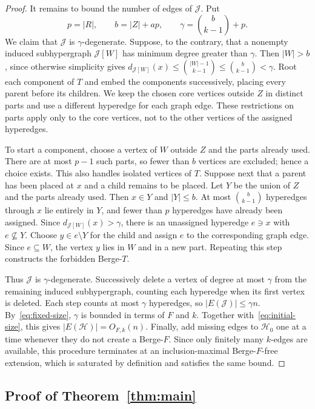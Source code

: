 \documentclass[11pt,a4paper]{article}
\numberwithin{equation}{section}
\theoremstyle{definition}
\theoremstyle{plain}
\newcommand{\HH}{\mathcal H}
\newcommand{\JJ}{\mathcal J}
\begin{document}
\begin{proof}
It remains to bound the number of edges of $\JJ$. Put
\[
 p=|R|,\qquad b=|Z|+ap,\qquad
 \gamma=\binom b{k-1}+p.
\]
We claim that $\JJ$ is $\gamma$-degenerate. Suppose, to the contrary,
that a nonempty induced subhypergraph $\JJ[W]$ has minimum degree
greater than $\gamma$. Then $|W|>b$, since otherwise simplicity gives
$d_{\JJ[W]}(x)\le\binom{|W|-1}{k-1}\le\binom b{k-1}<\gamma$.
Root each component of $T$ and embed the components successively,
placing every parent before its children. We keep the chosen core
vertices outside $Z$ in distinct parts and use a different hyperedge
for each graph edge. These restrictions on parts apply only to the
core vertices, not to the other vertices of the assigned hyperedges.

To start a component, choose a vertex of $W$ outside $Z$ and the
parts already used. There are at most $p-1$ such parts, so fewer
than $b$ vertices are excluded; hence a choice exists. This also
handles isolated vertices of $T$.
Suppose next that a parent has been placed at $x$ and a child remains
to be placed. Let $Y$ be the union of $Z$ and the parts already used.
Then $x\in Y$ and $|Y|\le b$. At most $\binom b{k-1}$ hyperedges
through $x$ lie entirely in $Y$, and fewer than $p$ hyperedges have
already been assigned. Since $d_{\JJ[W]}(x)>\gamma$, there is an
unassigned hyperedge $e\ni x$ with $e\nsubseteq Y$. Choose
$y\in e\setminus Y$ for the child and assign $e$ to the corresponding
graph edge. Since $e\subseteq W$, the vertex $y$ lies in $W$ and in
a new part. Repeating this step constructs the forbidden Berge-$T$.

Thus $\JJ$ is $\gamma$-degenerate. Successively delete a vertex of
degree at most $\gamma$ from the remaining induced subhypergraph,
counting each hyperedge when its first vertex is deleted.
Each step counts at most $\gamma$ hyperedges, so $|E(\JJ)|\le\gamma n$.
By~\eqref{eq:fixed-size}, $\gamma$ is bounded
in terms of $F$ and $k$. Together with~\eqref{eq:initial-size}, this
gives $|E(\HH)|=O_{F,k}(n)$. Finally, add missing edges to $\HH_0$
one at a time whenever they do not create a Berge-$F$. Since only
finitely many $k$-edges are available, this procedure terminates at
an inclusion-maximal Berge-$F$-free extension, which is saturated
by definition and satisfies the same bound.
\end{proof}

\FloatBarrier
\subsection{Proof of Theorem~\ref{thm:main}}
\end{document}
